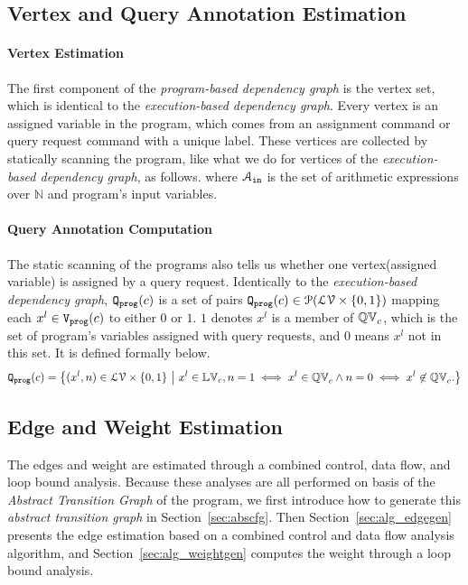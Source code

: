 \subsection{Vertex and Query Annotation Estimation}
\label{sec:alg_vertexgen}
\paragraph{Vertex Estimation}
The first component of the \emph{program-based dependency graph} is the vertex set, which is identical to the 
\emph{execution-based dependency graph}.
Every vertex is an assigned variable in the program, which comes from an assignment command or query request command with a unique label. 
These vertices are collected by statically scanning the program, like what we do for vertices of the \emph{execution-based dependency graph}, as follows.
%
where $\mathcal{A}_{\mathtt{in}}$ is the set of arithmetic expressions over $\mathbb{N}$ and program's input variables. 

\paragraph{Query Annotation Computation}
The static scanning of the programs also tells us whether one vertex(assigned variable) is assigned by a query request.
Identically to the 
\emph{execution-based dependency graph}, $\mathtt{{Q_{prog}}}(c)$ is
a set of pairs $\mathtt{{Q_{prog}}}(c) \in \mathcal{P}(\mathcal{LV} \times \{0, 1\} )$ 
mapping each $x^l \in \mathtt{{V_{prog}}}(c)$ to either $0$ or $1$. 
$1$ denotes $x^{l}$ is a member of $ \mathbb{QV}_{c}$, which is the set of program's variables assigned with query requests, 
and $0$ means $x^{l}$ not in this set. 
It is defined formally below.
%
\[\progF(c) =\left\{(x^l, n)  \in  \mathcal{LV} \times \{0, 1\} 
~ \middle\vert ~
x^l \in \lvar_{c},
n = 1 \iff x^l \in \qvar_{c} \land n = 0 \iff  x^l \not\in \qvar_{c} .
\right\}\]

\subsection{Edge and Weight Estimation}
\label{sec:alg_weightedgegen}
The edges and weight are estimated through a combined control, data flow, and loop bound analysis.
Because these analyses are all performed on basis of the \emph{Abstract Transition Graph} of the program, we first introduce how to generate this \emph{abstract transition graph} in Section~\ref{sec:abscfg}.
Then Section~\ref{sec:alg_edgegen} presents the edge estimation based on a combined control and data flow analysis algorithm,
and Section~\ref{sec:alg_weightgen}
computes the weight through a loop bound analysis.

